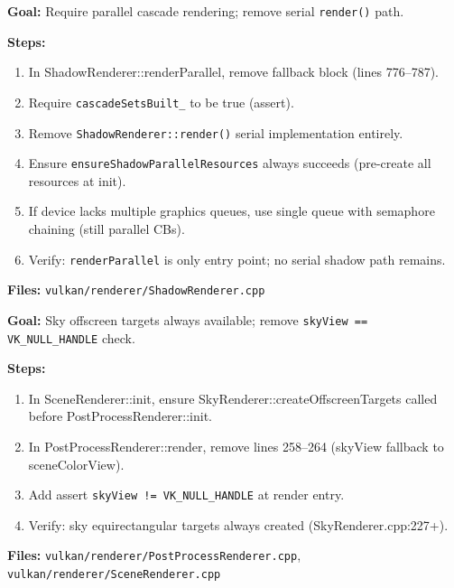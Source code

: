 \documentclass[11pt,a4paper]{article}
\begin{document}
\begin{tcolorbox}[promptbox={Prompt: Remove Shadow Pass Serial Fallback}]
\textbf{Goal:} Require parallel cascade rendering; remove serial \texttt{render()} path.

\textbf{Steps:}
\begin{enumerate}
    \item In ShadowRenderer::renderParallel, remove fallback block (lines 776–787).
    \item Require \texttt{cascadeSetsBuilt\_} to be true (assert).
    \item Remove \texttt{ShadowRenderer::render()} serial implementation entirely.
    \item Ensure \texttt{ensureShadowParallelResources} always succeeds (pre-create all resources at init).
    \item If device lacks multiple graphics queues, use single queue with semaphore chaining (still parallel CBs).
    \item Verify: \texttt{renderParallel} is only entry point; no serial shadow path remains.
\end{enumerate}

\textbf{Files:} \texttt{vulkan/renderer/ShadowRenderer.cpp}
\end{tcolorbox}

\begin{tcolorbox}[promptbox={Prompt: Remove Post-Process Sky Fallback}]
\textbf{Goal:} Sky offscreen targets always available; remove \texttt{skyView == VK\_NULL\_HANDLE} check.

\textbf{Steps:}
\begin{enumerate}
    \item In SceneRenderer::init, ensure SkyRenderer::createOffscreenTargets called before PostProcessRenderer::init.
    \item In PostProcessRenderer::render, remove lines 258–264 (skyView fallback to sceneColorView).
    \item Add assert \texttt{skyView != VK\_NULL\_HANDLE} at render entry.
    \item Verify: sky equirectangular targets always created (SkyRenderer.cpp:227+).
\end{enumerate}

\textbf{Files:} \texttt{vulkan/renderer/PostProcessRenderer.cpp}, \texttt{vulkan/renderer/SceneRenderer.cpp}
\end{tcolorbox}
\end{document}
